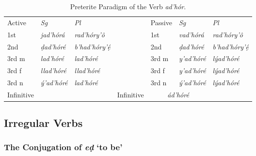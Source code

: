 \documentclass[a4paper, 12pt, oneside, final]{article}
\let \nf \normalfont
\begin{document}
\begin{table}[H]
\centering
\noindent\begin{tabular}{@{}|>{}l|>{\it}l|>{\it}l|>{}l|>{}l|>{\it}l|>{\it}l|}\cline{1-3}\cline{5-7}
\nf Active & \nf Sg   & \nf Pl     & \nf & \nf Passive & \nf Sg   & \nf Pl    \\\cline{1-3}\cline{5-7}
1st        & jad’hórá  & rad’hóry’ô     &     & 1st     & vad’hórá  & rad’hóry’ô   \\\cline{1-3}\cline{5-7}
2nd        & ḍad’hóré  & b’had’hóry’ẹ́  &     & 2nd      & ḍad’hóré  & b’had’hóry’ẹ́ \\\cline{1-3}\cline{5-7}
3rd m      & lad’hóré  & lad’hóré    &     & 3rd m      & y’ad’hóré & lýad’hóré  \\\cline{1-3}\cline{5-7}
3rd f      & llad’hóré & llad’hóré   &     & 3rd f      & y’ad’hóré & lýad’hóré  \\\cline{1-3}\cline{5-7}
3rd n      & ý’ad’hóré & lad’hóré   &     & 3rd n       & ý’ad’hóré & lýad’hóré  \\\cline{1-3}\cline{5-7}
Infinitive & \multicolumn{2}{c|}{\it dad’hóré} & & Infinitive & \multicolumn{2}{c|}{\it ád’hóré} \\\cline{1-3}\cline{5-7}
\end{tabular}
\caption{Preterite Paradigm of the Verb \emph{ad’hór}.}\label{tab:adhor-paradigm-pret}
\end{table}


\subsection{Irregular Verbs}\label{subsec:irregular-verbs}
\subsubsection{The Conjugation of \textit{eḍ} ‘to be’}
\end{document}
